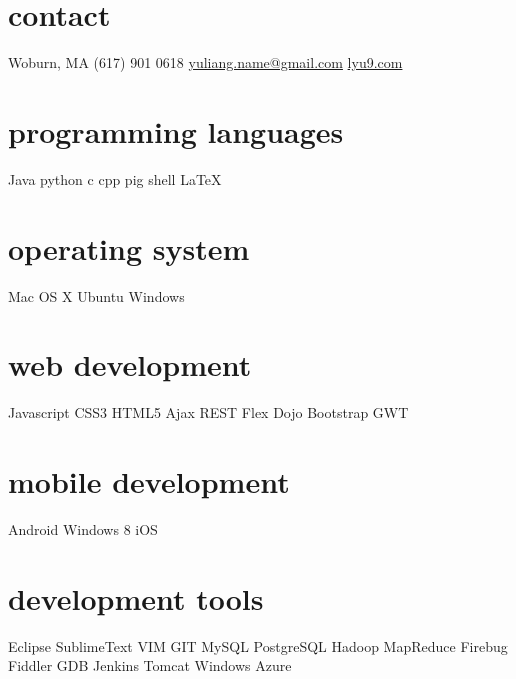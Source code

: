 \documentclass[]{ly-cv} %
\begin{document}
\begin{aside} %
\section{contact}
Woburn, MA
(617) 901 0618
\href{mailto:yuliang.name@gmail.com}{yuliang.name@gmail.com}
\href{http://lyu9.com}{lyu9.com}
\section{programming languages}
Java python c cpp 
pig shell \LaTeX
\section{operating system}
Mac OS X Ubuntu Windows
\section{web development}
Javascript CSS3 HTML5 
Ajax REST Flex Dojo 
Bootstrap GWT
\section{mobile development}
Android Windows 8 iOS
\section{development tools}
Eclipse SublimeText VIM
GIT MySQL PostgreSQL
Hadoop MapReduce
Firebug Fiddler GDB
Jenkins Tomcat 
Windows Azure
\end{aside}
\end{document}
